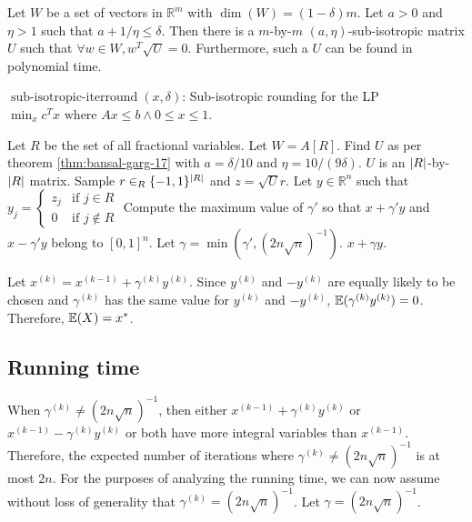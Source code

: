 \begin{theorem}
\label{thm:bansal-garg-17}
Let $W$ be a set of vectors in $\mathbb{R}^m$ with $\dim(W) = (1-\delta)m$.
Let $a > 0$ and $\eta > 1$ such that $a + 1/\eta \le \delta$.
Then there is a $m$-by-$m$ $(a, \eta)$-sub-isotropic matrix $U$
such that $\forall w \in W, w^T\sqrt{U} = 0$.
Furthermore, such a $U$ can be found in polynomial time.
\end{theorem}

\begin{algorithm}[H]
\caption{$\operatorname{sub-isotropic-iterround}(x, \delta)$:
Sub-isotropic rounding for the LP
${\min_x c^Tx \textrm{ where } Ax \le b \wedge 0 \le x \le 1}$.}
\begin{algorithmic}[1]
\State Let $R$ be the set of all fractional variables. Let $W = A[R]$.
\State Find $U$ as per theorem \ref{thm:bansal-garg-17}
with $a = \delta/10$ and $\eta = 10/(9\delta)$.
$U$ is an $\left\lvert R \right\rvert$-by-$\left\lvert R \right\rvert$ matrix.
\State Sample $r \in_R \{-1, 1\}^{\left\lvert R \right\rvert}$ and $z = \sqrt{U}r$.
\State Let $y \in \mathbb{R}^n$ such that
${\displaystyle y_j = \begin{cases} z_j & \textrm{if } j \in R
\\ 0 & \textrm{if } j \not\in R \end{cases} }$
\State Compute the maximum value of $\gamma'$ so that
$x + \gamma' y$ and $x - \gamma' y$ belong to $[0, 1]^n$.
\State Let $\gamma = \min(\gamma', (2n\sqrt{n})^{-1})$.
\State \Return $x + \gamma y$.
\end{algorithmic}
\end{algorithm}

Let $x^{(k)} = x^{(k-1)} + \gamma^{(k)}y^{(k)}$.
Since $y^{(k)}$ and $-y^{(k)}$ are equally likely to be chosen
and $\gamma^{(k)}$ has the same value for $y^{(k)}$ and $-y^{(k)}$,
$\operatorname{\mathbb{E}}(\gamma^{(k)}y^{(k)}) = 0$. Therefore, $\operatorname{\mathbb{E}}(X) = x^*$.

\subsection{Running time}

When $\gamma^{(k)} \neq (2n\sqrt{n})^{-1}$, then either $x^{(k-1)} + \gamma^{(k)}y^{(k)}$
or $x^{(k-1)} - \gamma^{(k)}y^{(k)}$ or both have more integral variables than $x^{(k-1)}$.
Therefore, the expected number of iterations where $\gamma^{(k)} \neq (2n\sqrt{n})^{-1}$
is at most $2n$. For the purposes of analyzing the running time, we can now assume
without loss of generality that $\gamma^{(k)} = (2n\sqrt{n})^{-1}$.
Let $\gamma = (2n\sqrt{n})^{-1}$.

